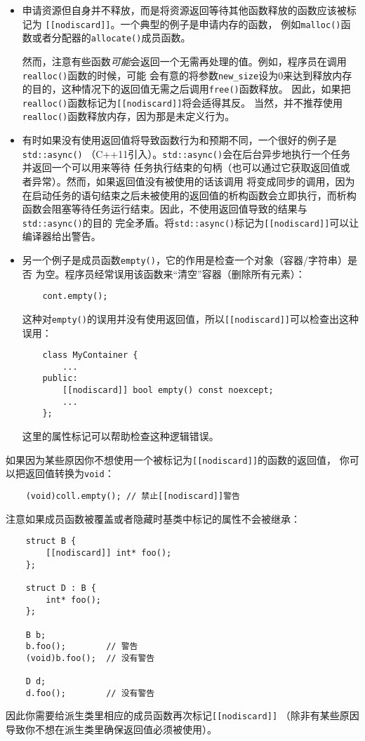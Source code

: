 \begin{itemize}
    \item 申请资源但自身并不释放，而是将资源返回等待其他函数释放的函数应该被标记为
    \texttt{[[nodiscard]]}。一个典型的例子是申请内存的函数，
    例如\texttt{malloc()}函数或者分配器的\texttt{allocate()}成员函数。

    然而，注意有些函数\emph{可能}会返回一个无需再处理的值。例如，程序员在调用\texttt{realloc()}函数的时候，可能
    会有意的将参数\texttt{new\_size}设为0来达到释放内存的目的，这种情况下的返回值无需之后调用\texttt{free()}函数释放。
    因此，如果把\texttt{realloc()}函数标记为\texttt{[[nodiscard]]}将会适得其反。
    当然，并不推荐使用\texttt{realloc()}函数释放内存，因为那是未定义行为。
    \item 有时如果没有使用返回值将导致函数行为和预期不同，一个很好的例子是\texttt{std::async()}
    （C++11引入）。\texttt{std::async()}会在后台异步地执行一个任务并返回一个可以用来等待
    任务执行结束的句柄（也可以通过它获取返回值或者异常）。然而，如果返回值没有被使用的话该调用
    将变成同步的调用，因为在启动任务的语句结束之后未被使用的返回值的析构函数会立即执行，而析构
    函数会阻塞等待任务运行结束。因此，不使用返回值导致的结果与\texttt{std::async()}的目的
    完全矛盾。将\texttt{std::async()}标记为\texttt{[[nodiscard]]}可以让编译器给出警告。
    \item 另一个例子是成员函数\texttt{empty()}，它的作用是检查一个对象（容器/字符串）是否
    为空。程序员经常误用该函数来“清空”容器（删除所有元素）：
    \begin{lstlisting}
    cont.empty();
    \end{lstlisting}
    这种对\texttt{empty()}的误用并没有使用返回值，所以\texttt{[[nodiscard]]}可以检查出这种误用：
    \begin{lstlisting}
    class MyContainer {
        ...
    public:
        [[nodiscard]] bool empty() const noexcept;
        ...
    };
    \end{lstlisting}
    这里的属性标记可以帮助检查这种逻辑错误。
\end{itemize}
如果因为某些原因你不想使用一个被标记为\texttt{[[nodiscard]]}的函数的返回值，
你可以把返回值转换为\texttt{void}：
\begin{lstlisting}
    (void)coll.empty(); // 禁止[[nodiscard]]警告
\end{lstlisting}
注意如果成员函数被覆盖或者隐藏时基类中标记的属性不会被继承：
\begin{lstlisting}
    struct B {
        [[nodiscard]] int* foo();
    };

    struct D : B {
        int* foo();
    };

    B b;
    b.foo();        // 警告
    (void)b.foo();  // 没有警告

    D d;
    d.foo();        // 没有警告
\end{lstlisting}
因此你需要给派生类里相应的成员函数再次标记\texttt{[[nodiscard]]}
（除非有某些原因导致你不想在派生类里确保返回值必须被使用）。

